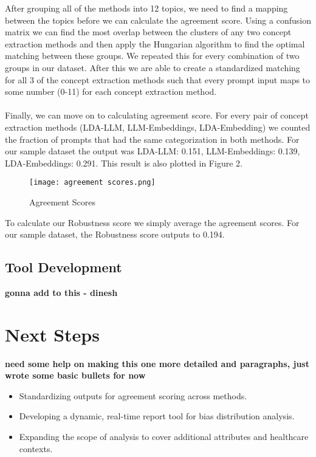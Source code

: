 \documentclass{article}
\begin{document}
After grouping all of the methods into 12 topics, we need to find a mapping between the topics before we can calculate the agreement score. Using a confusion matrix we can find the most overlap between the clusters of any two concept extraction methods and then apply the Hungarian algorithm to find the optimal matching between these groups. We repeated this for every combination of two groups in our dataset. After this we are able to create a standardized matching for all 3 of the concept extraction methods such that every prompt input maps to some number (0-11) for each concept extraction method. 
\\\\
Finally, we can move on to calculating agreement score. For every pair of concept extraction methods (LDA-LLM, LLM-Embeddings, LDA-Embedding) we counted the fraction of prompts that had the same categorization in both methods. For our sample dataset the output was LDA-LLM: 0.151, LLM-Embeddings: 0.139, LDA-Embeddings: 0.291. This result is also plotted in Figure 2.
\begin{figure}
    \centering
    \texttt{[image: agreement scores.png]}
    \caption{Agreement Scores}
    \label{fig:enter-label}
\end{figure}

To calculate our Robustness score we simply average the agreement scores. For our sample dataset, the Robustness score outputs to 0.194.
\pagebreak
\subsection{Tool Development}
\textbf{gonna add to this - dinesh}

\section{Next Steps}
\textbf{need some help on making this one more detailed and paragraphs, just wrote some basic  bullets for now}

\begin{itemize}
    \item Standardizing outputs for agreement scoring across methods.
    \item Developing a dynamic, real-time report tool for bias distribution analysis.
    \item Expanding the scope of analysis to cover additional attributes and healthcare contexts.
\end{itemize}


\end{document}
